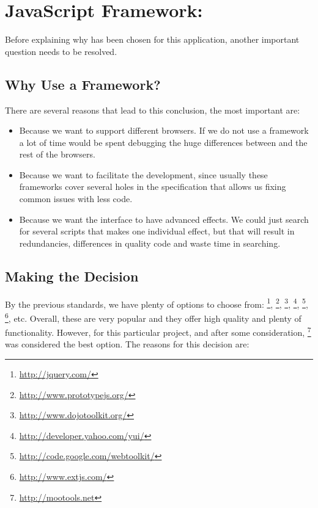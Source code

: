 \section{JavaScript Framework: } %
\label{sec:mootools}

Before explaining why  has been chosen for this application, another important question needs to be resolved.

\subsection{Why Use a  Framework?} %
\label{sub:whymootools}

There are several reasons that lead to this conclusion, the most important are:

\begin{itemize}

  \item Because we want to support different browsers.
  If we do not use a framework a lot of time would be spent debugging the huge differences between  and the rest of the browsers.

  \item Because we want to facilitate the development, since usually these frameworks cover several holes in the  specification that allows us fixing common issues with less code.

  \item Because we want the interface to have advanced effects.
  We could just search for several scripts that makes one individual effect, but that will result in redundancies, differences in quality code and waste time in searching.

\end{itemize}


\subsection{Making the Decision} %
\label{sub:decision}

By the previous standards, we have plenty of options to choose from:
\footnote{\url{http://jquery.com/}},
\footnote{\url{http://www.prototypejs.org/}},
\footnote{\url{http://www.dojotoolkit.org/}},
\footnote{\url{http://developer.yahoo.com/yui/}},
\footnote{\url{http://code.google.com/webtoolkit/}},
\footnote{\url{http://www.extjs.com/}}, etc.
Overall, these are very popular and they offer high quality and plenty of functionality.
However, for this particular project, and after some consideration, \footnote{\url{http://mootools.net}} was considered the best option.
The reasons for this decision are:

